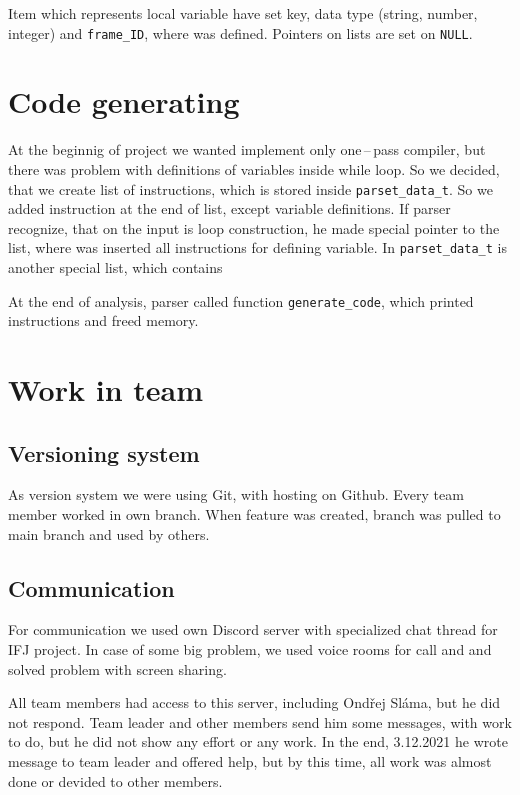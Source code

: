 \documentclass[11pt]{article}
\begin{document}
Item which represents local variable have set key, data type (string, number, integer) and \texttt{frame\_ID}, where was defined. Pointers on lists are set on \texttt{NULL}.

\section{Code generating}
At the beginnig of project we wanted implement only one\,--\,pass compiler, but there was problem with definitions of variables inside while loop. So we decided, that we 
create list of instructions, which is stored inside \texttt{parset\_data\_t}. So we added instruction at the end of list, except variable definitions. If parser recognize, that
on the input is loop construction, he made special pointer to the list, where was inserted all instructions for defining variable.
In \texttt{parset\_data\_t} is another special list, which contains 

At the end of analysis, parser called function \texttt{generate\_code}, which printed instructions and freed memory.

\section{Work in team}
\subsection{Versioning system}
As version system we were using Git, with hosting on Github. Every team member worked in own branch. When feature was created, branch was
pulled to main branch and used by others.
\subsection{Communication}
For communication we used own Discord server with specialized chat thread for IFJ project. In case of some big problem, we used voice rooms for call and
and solved problem with screen sharing.

All team members had access to this server, including Ondřej Sláma, but he did not respond. Team leader and other members send him some messages, with work to do, but he did not 
show any effort or any work. In the end, 3.12.2021 he wrote message to team leader and offered help, but by this time, all work was almost done or devided to 
other members. 
\end{document}
